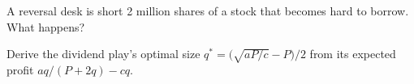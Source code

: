 \begin{interviewq}\label{iq:hf:options-cross-venue-and-volatility-arbitrage-at-speed:5}
A reversal desk is short 2 million shares of a stock that becomes hard to borrow. What happens?
\end{interviewq}

\begin{interviewq}\label{iq:hf:options-cross-venue-and-volatility-arbitrage-at-speed:6}
Derive the dividend play's optimal size $q^\ast=\bigl(\sqrt{aP/c}-P\bigr)/2$ from its expected profit $aq/(P+2q)-cq$.
\end{interviewq}
